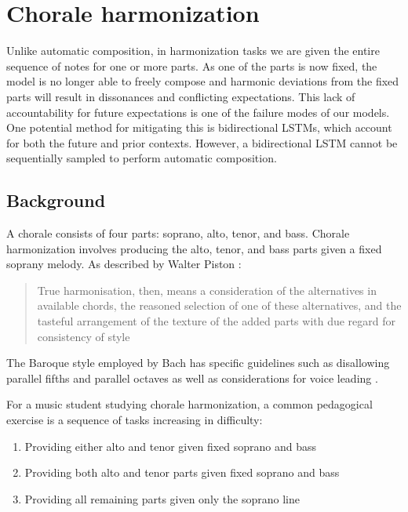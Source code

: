 \documentclass[dissertation.tex]{subfiles}
\begin{document}
\chapter{Chorale harmonization}

Unlike automatic composition, in harmonization tasks we are given the entire sequence of notes
for one or more parts. As one of the parts is now fixed, the model is no longer able to freely
compose and harmonic deviations from the fixed parts will result in dissonances and conflicting
expectations. This lack of accountability for future expectations is one of the failure modes of our models.
One potential method for mitigating this is bidirectional LSTMs\cite{Graves2005}, which account
for both the future and prior contexts. However, a bidirectional LSTM cannot be sequentially
sampled to perform automatic composition.

\section{Background}

A chorale consists of four parts: soprano, alto, tenor, and bass. Chorale harmonization
involves producing the alto, tenor, and bass parts given a fixed soprany melody. As described
by Walter Piston \cite{piston1978harmony}:

\begin{quote}
  True harmonisation, then, means a consideration of the alternatives in available chords, the reasoned selection of one
  of these alternatives, and the tasteful arrangement of the texture of the added parts with due regard
  for consistency of style
\end{quote}

The Baroque style employed by Bach has specific guidelines
such as disallowing parallel fifths and parallel octaves as well as
considerations for voice leading \cite{piston1978harmony}.

For a music student studying chorale harmonization, a common pedagogical
exercise \cite{denny1960oxford}\cite{piston1978harmony} is a sequence of tasks increasing in difficulty:
\begin{enumerate}
  \item Providing either alto and tenor given fixed soprano and bass
  \item Providing both alto and tenor parts given fixed soprano and bass
  \item Providing all remaining parts given only the soprano line
\end{enumerate}
\end{document}
